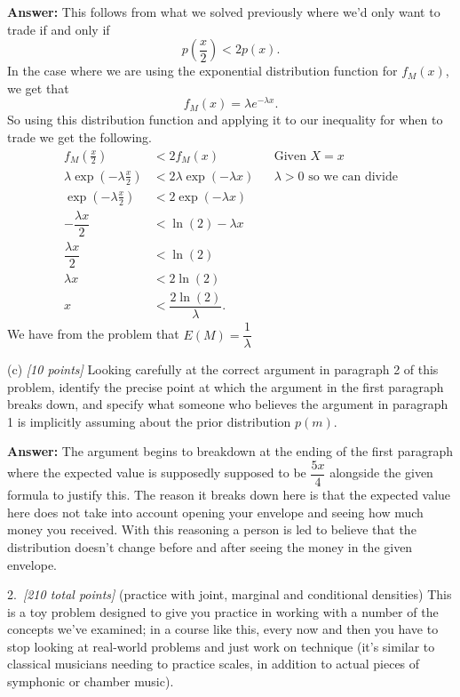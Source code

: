 \documentclass[12pt]{article}
\begin{document}
\begin{itemize}
\textbf{Answer:}
This follows from what we solved previously where we'd only want to trade if and only if \[p(\dfrac{x}{2}) < 2p(x).\]
In the case where we are using the exponential distribution function for $f_M(x)$, we get that \[f_M(x) = \lambda e^{-\lambda x}.\]
So using this distribution function and applying it to our inequality for when to trade we get the following.
\begin{align*}
    f_M(\frac{x}{2}) &< 2f_M(x) && \text{Given $X= x$} \\
    \lambda \exp(-\lambda \frac{x}{2})&< 2\lambda \exp(-\lambda x) && \text{$\lambda> 0$ so we can divide}\\
    \exp(-\lambda \frac{x}{2})&<2\exp(-\lambda x) \\
    -\dfrac{\lambda x}{2}&< \ln(2) - \lambda x \\
    \dfrac{\lambda x}{2}&< \ln(2) \\
    \lambda x &<2\ln(2) \\
    x &< \dfrac{2\ln(2)}{\lambda}.
\end{align*}
We have from the problem that $E(M) = \dfrac{1}{\lambda}$ 
\end{itemize}
(c) \textit{[10 points]} Looking carefully at the correct argument in paragraph 2 of this problem, identify the precise point at which the argument in the
first paragraph breaks down, and specify what someone who believes the
argument in paragraph 1 is implicitly assuming about the prior distribution $p ( m )$. 

\textbf{Answer:}
The argument begins to breakdown at the ending of the first paragraph where the expected value is supposedly supposed to be $\dfrac{5x}{4}$ alongside the given formula to justify this. The reason it breaks down here is that the expected value here does not take into account opening your envelope and seeing how much money you received. With this reasoning a person is led to believe that the distribution doesn't change before and after seeing the money in the given envelope. 

\newpage

2.~\textit{[210 total points]} (practice with joint, marginal and conditional densities) This is a toy problem designed to give you practice in working with a number of the concepts we've examined; in a course like this, every now and then you have to stop looking at real-world problems and just work on technique (it's similar to classical musicians needing to practice scales, in addition to actual pieces of symphonic or chamber music).
\end{document}
